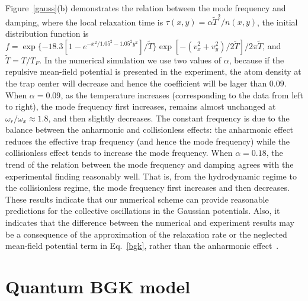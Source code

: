 Figure~\ref{gauss}(b) demonstrates the relation between the mode
frequency and damping, where the local relaxation time is
$\tau(x,y)=\alpha \widetilde{T}^2/n(x,y)$, the initial
distribution function is
$f=\exp\{-18.3[1-e^{-x^2/1.05^2-1.05^2y^2}]/\widetilde{T}\}\exp[-(v_x^2+v_y^2)/2\widetilde{T}]/2\pi\widetilde{T}$,
and $\widetilde{T}=T/T_F$. {In the numerical simulation we use two
values of $\alpha$, because if the repulsive mean-field potential
is presented in the experiment, the atom density at the trap
center will decrease and hence the coefficient will be lager than
$0.09$. When $\alpha=0.09$, as the temperature increases
(corresponding to the data from left to right), the mode frequency
first increases, remains almost unchanged at
$\omega_r/\omega_x\approx1.8$, and then slightly decreases. The
constant frequency is due to the balance between the anharmonic
and collisionless effects: the anharmonic effect reduces the
effective trap frequency (and hence the mode frequency) while the
collisionless effect tends to increase the mode frequency. When
$\alpha=0.18$, the trend of the relation between the mode
frequency and damping agrees with the experimental finding
reasonably well. That is, from the hydrodynamic regime to the
collisionless regime, the mode frequency first increases and then
decreases. These results indicate that our numerical scheme can
provide reasonable predictions for the collective oscillations in
the Gaussian potentials. Also, it indicates that the difference
between the numerical and experiment results may be a consequence
of the approximation of the relaxation rate or the neglected
mean-field potential term in Eq.~\eqref{bgk}, rather than the
anharmonic effect~\cite{Riedl2008}.}



\section{Quantum BGK model}


